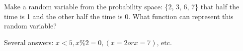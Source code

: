 \question Make a random variable from the probability space: \{2, 3, 6, 7\} 
that half the time is 1 and the other half the time is 0. What function 
can represent this random variable?
\begin{solution}[2cm]
Several answers: $x < 5, x\%2 = 0, (x = 2 or x = 7)$, etc.
\end{solution}